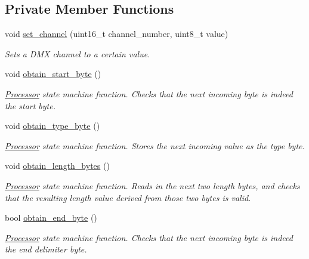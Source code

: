\subsection*{Private Member Functions}
\begin{DoxyCompactItemize}
\item 
void \hyperlink{classDMXPro_1_1Processor_a3632542df4aae7719d6ab2e964271e36}{set\+\_\+channel} (uint16\+\_\+t channel\+\_\+number, uint8\+\_\+t value)
\begin{DoxyCompactList}\small\item\em Sets a D\+MX channel to a certain value. \end{DoxyCompactList}\item 
void \hyperlink{classDMXPro_1_1Processor_a792bcffc8ca31367baf568305516dac8}{obtain\+\_\+start\+\_\+byte} ()
\begin{DoxyCompactList}\small\item\em \hyperlink{classDMXPro_1_1Processor}{Processor} state machine function. Checks that the next incoming byte is indeed the start byte. \end{DoxyCompactList}\item 
void \hyperlink{classDMXPro_1_1Processor_ad2e73b51c77d95ff948b2b994eba3cfd}{obtain\+\_\+type\+\_\+byte} ()
\begin{DoxyCompactList}\small\item\em \hyperlink{classDMXPro_1_1Processor}{Processor} state machine function. Stores the next incoming value as the type byte. \end{DoxyCompactList}\item 
void \hyperlink{classDMXPro_1_1Processor_a229f4d96176b4fbcda52fa09e44e297a}{obtain\+\_\+length\+\_\+bytes} ()
\begin{DoxyCompactList}\small\item\em \hyperlink{classDMXPro_1_1Processor}{Processor} state machine function. Reads in the next two length bytes, and checks that the resulting length value derived from those two bytes is valid. \end{DoxyCompactList}\item 
bool \hyperlink{classDMXPro_1_1Processor_ad8895162387072e0c5c44101f516b351}{obtain\+\_\+end\+\_\+byte} ()
\begin{DoxyCompactList}\small\item\em \hyperlink{classDMXPro_1_1Processor}{Processor} state machine function. Checks that the next incoming byte is indeed the end delimiter byte. \end{DoxyCompactList}\item 

\end{DoxyCompactItemize}
